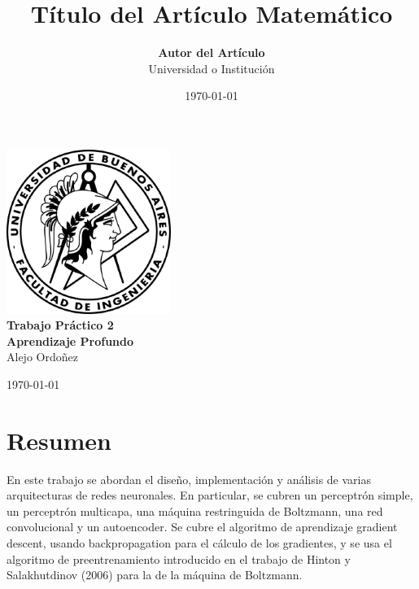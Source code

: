 \documentclass[12pt,a4paper]{article}
\title{\textbf{Título del Artículo Matemático}}
\author{\textbf{Autor del Artículo}\\ Universidad o Institución}
\date{\today}
\begin{document}
\begin{titlepage}
    \centering
    \vspace*{5cm}
    
    \includegraphics[width=0.4\textwidth]{logo-fiuba.png}\\[1cm]
    
    {\Huge \textbf{Trabajo Práctico 2}}\\[0.2cm]

    {\large \textbf{Aprendizaje Profundo}\\ Alejo Ordoñez}
    
    \vfill
    
    {\large \today}
\end{titlepage}

\section*{Resumen}
En este trabajo se abordan el diseño, implementación y análisis de varias arquitecturas de redes neuronales. En particular, se cubren un perceptrón simple, un perceptrón multicapa, una máquina restringuida de Boltzmann, una red convolucional y un autoencoder. Se cubre el algoritmo de aprendizaje gradient descent, usando backpropagation para el cálculo de los gradientes, y se usa el algoritmo de preentrenamiento introducido en el trabajo de Hinton y Salakhutdinov (2006) para la de la máquina de Boltzmann.
\end{document}
